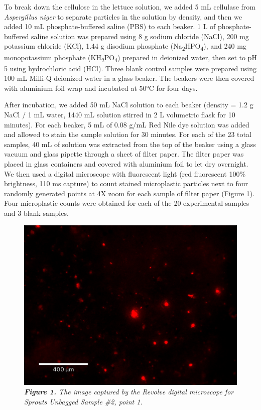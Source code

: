 \documentclass[]{article}
\begin{document}
To break down the cellulose in the lettuce solution, we added 5 mL
cellulase from \emph{Aspergillus niger} to separate particles in the
solution by density, and then we added 10 mL phosphate-buffered saline
(PBS) to each beaker. 1 L of phosphate-buffered saline solution was
prepared using 8 g sodium chloride (NaCl), 200 mg potassium chloride
(KCl), 1.44 g disodium phosphate
(Na\textsubscript{2}HPO\textsubscript{4}), and 240 mg monopotassium
phosphate (KH\textsubscript{2}PO\textsubscript{4}) prepared in deionized
water, then set to pH 5 using hydrochloric acid (HCl). Three blank
control samples were prepared using 100 mL Milli-Q deionized water in a
glass beaker. The beakers were then covered with aluminium foil wrap and
incubated at 50°C for four days.

After incubation, we added 50 mL NaCl solution to each beaker (density =
1.2 g NaCl / 1 mL water, 1440 mL solution stirred in 2 L volumetric
flask for 10 minutes). For each beaker, 5 mL of 0.08 g/mL Red Nile dye
solution was added and allowed to stain the sample solution for 30
minutes. For each of the 23 total samples, 40 mL of solution was
extracted from the top of the beaker using a glass vacuum and glass
pipette through a sheet of filter paper. The filter paper was placed in
glass containers and covered with aluminium foil to let dry overnight.
We then used a digital microscope with fluorescent light (red
fluorescent 100\% brightness, 110 ms capture) to count stained
microplastic particles next to four randomly generated points at 4X zoom
for each sample of filter paper (Figure 1). Four microplastic counts
were obtained for each of the 20 experimental samples and 3 blank
samples.

\begin{figure}
\centering
\includegraphics{Sprouts_UB_2_Image_0001.jpg}
\caption{\emph{\textbf{Figure 1.} The image captured by the Revolve
digital microscope for Sprouts Unbagged Sample \#2, point 1.}}
\end{figure}
\end{document}
